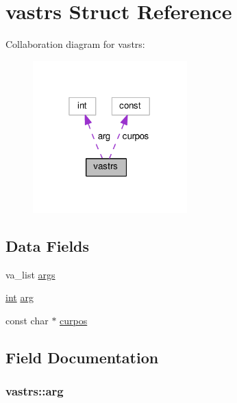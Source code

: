 \hypertarget{structvastrs}{}\section{vastrs Struct Reference}
\label{structvastrs}


Collaboration diagram for vastrs\+:
\nopagebreak
\begin{figure}[H]
\begin{center}
\leavevmode
\includegraphics[width=169pt]{structvastrs__coll__graph}
\end{center}
\end{figure}
\subsection*{Data Fields}
\begin{DoxyCompactItemize}
\item 
va\+\_\+list \hyperlink{structvastrs_a87fb5e99f88cc222085212bf9935e0b3}{args}
\item 
\hyperlink{pcre_8txt_a42dfa4ff673c82d8efe7144098fbc198}{int} \hyperlink{structvastrs_aa65b80f6c085cd752fa5b3b5da54105a}{arg}
\item 
const char $\ast$ \hyperlink{structvastrs_a13c8f8d17ed73d659d51dbc49941756c}{curpos}
\end{DoxyCompactItemize}


\subsection{Field Documentation}
\subsubsection[{\texorpdfstring{arg}{arg}}]{ vastrs\+::arg}\hypertarget{structvastrs_aa65b80f6c085cd752fa5b3b5da54105a}{}\label{structvastrs_aa65b80f6c085cd752fa5b3b5da54105a}
